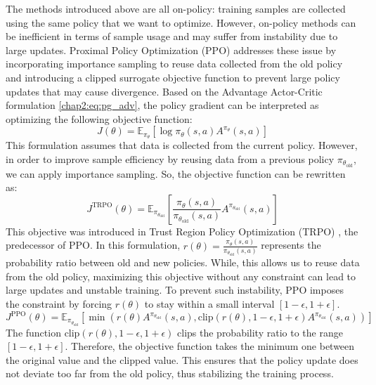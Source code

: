 The methods introduced above are all on-policy: training samples are collected using the same policy that we want to optimize.
However, on-policy methods can be inefficient in terms of sample usage and may suffer from instability due to large updates.
Proximal Policy Optimization (PPO) \cite{PPO} addresses these issue by incorporating importance sampling to reuse data collected from the old policy and introducing a clipped surrogate objective function to prevent large policy updates that may cause divergence.
Based on the Advantage Actor-Critic formulation \cref{chap2:eq:pg_adv}, the policy gradient can be interpreted as optimizing the following objective function:
\begin{equation}
  J(\theta) = \mathbb{E}_{\pi_\theta}[\log \pi_\theta(s, a) A^{\pi_\theta}(s, a)]
\end{equation}
This formulation assumes that data is collected from the current policy.  
However, in order to improve sample efficiency by reusing data from a previous policy $\pi_{\theta_\text{old}}$, we can apply importance sampling.
So, the objective function can be rewritten as:
\begin{equation}
  J^{\text{TRPO}}(\theta) = \mathbb{E}_{\pi_{\theta_\text{old}}} \left[ \frac{\pi_\theta (s, a)}{\pi_{\theta_\text{old}}(s, a)}A^{\pi_{\theta_\text{old}}}(s, a) \right]
\end{equation}
This objective was introduced in Trust Region Policy Optimization (TRPO) \cite{TRPO}, the predecessor of PPO.
In this formulation, $r(\theta) = \frac{\pi_\theta (s, a)}{\pi_{\theta_\text{old}}(s, a)}$ represents the probability ratio between old and new policies.
While, this allows us to reuse data from the old policy, maximizing this objective without any constraint can lead to large updates and unstable training.
To prevent such instability, PPO imposes the constraint by forcing $r(\theta)$ to stay within a small interval $[1 - \epsilon, 1 + \epsilon]$.
\begin{equation}
  J^{\text{PPO}}(\theta) = \mathbb{E}_{\pi_{\theta_\text{old}}} \left[ \min \left( r(\theta) A^{\pi_{\theta_\text{old}}}(s, a), \text{clip}(r(\theta), 1 - \epsilon, 1 + \epsilon) A^{\pi_{\theta_\text{old}}}(s, a) \right) \right]
\end{equation}
The function $\text{clip}(r(\theta), 1 - \epsilon, 1 + \epsilon)$ clips the probability ratio to the range $[1 - \epsilon, 1 + \epsilon]$.
Therefore, the objective function takes the minimum one between the original value and the clipped value.
This ensures that the policy update does not deviate too far from the old policy, thus stabilizing the training process.

